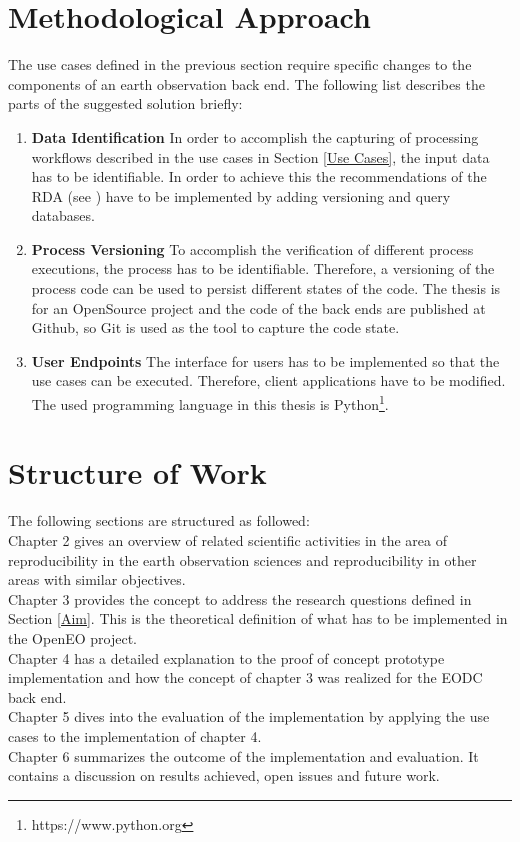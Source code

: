\documentclass[draft,final]{vutinfth} %
\begin{document}
\section{Methodological Approach}\label{Method}
The use cases defined in the previous section require specific changes to the components of an earth observation back end. The following list describes the parts of the suggested solution briefly: 


\begin{enumerate}
	\item \textbf{Data Identification}
	In order to accomplish the capturing of processing workflows described in the use cases in Section \ref{Use Cases}, the input data has to be identifiable. In order to achieve this the recommendations of the RDA (see \cite{Rauber2016IdentificationOR}) have to be implemented by adding versioning and query databases. 
	
	\item \textbf{Process Versioning}
	To accomplish the verification of different process executions, the process has to be identifiable. Therefore, a versioning of the process code can be used to persist different states of the code. The thesis is for an OpenSource project and the code of the back ends are published at Github, so Git is used as the tool to capture the code state. 
		
	\item \textbf{User Endpoints}
	The interface for users has to be implemented so that the use cases can be executed. Therefore, client applications have to be modified. The used programming language in this thesis is Python\footnote{https://www.python.org}.
\end{enumerate}

\section{Structure of Work}\label{Structure}
The following sections are structured as followed:\\
Chapter 2 gives an overview of related scientific activities in the area of reproducibility in the earth observation sciences and reproducibility in other areas with similar objectives. \\
Chapter 3 provides the concept to address the research questions defined in Section \ref{Aim}.  This is the theoretical definition of what has to be implemented in the OpenEO project.\\
Chapter 4 has a detailed explanation to the proof of concept prototype implementation and how the concept of chapter 3 was realized for the EODC back end. \\
Chapter 5 dives into the evaluation of the implementation by applying the use cases to the implementation of chapter 4.\\
Chapter 6 summarizes the outcome of the implementation and evaluation. It contains a discussion on results achieved, open issues and future work. \\
\end{document}
